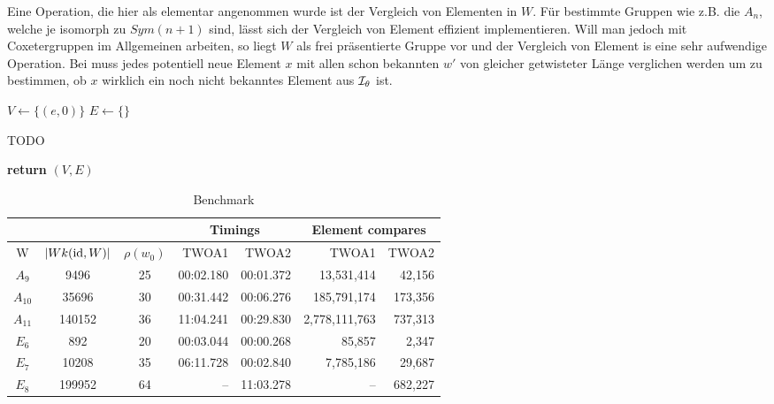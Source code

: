 Eine Operation, die hier als elementar angenommen wurde ist der Vergleich von
Elementen in $W$. Für bestimmte Gruppen wie z.B. die $A_n$, welche je isomorph
zu $Sym(n+1)$ sind, lässt sich der Vergleich von Element effizient
implementieren. Will man jedoch mit Coxetergruppen im Allgemeinen arbeiten, so
liegt $W$ als frei präsentierte Gruppe vor und der Vergleich von Element is eine
sehr aufwendige Operation. Bei  muss jedes
potentiell neue Element $x$ mit allen schon bekannten $w'$ von gleicher
getwisteter Länge verglichen werden um zu bestimmen, ob $x$ wirklich ein noch
nicht bekanntes Element aus $\mathcal{I}_{\theta}$ ist.

\begin{algo}[Algorithmus 2]
	\hfill
	\label{twoa2}
	\begin{algorithmic}[1]
	 
	\State $V \gets \{(e,0)\}$
	\State $E \gets \{\}$

		\State TODO
	\EndFor

	\State \textbf{return} $(V,E)$
	\EndProcedure
	\end{algorithmic}
\end{algo}

\begin{table}
	\label{benchmark-twoa}
	\centering
	\begin{tabular}{|c|c|c|r|r|r|r|}
	\hline
	\multicolumn{3}{|c|}{} & \multicolumn{2}{|c|}{Timings} &
	\multicolumn{2}{|c|}{Element compares}\\
	\hline
	W & $|Wk(\operatorname{id},W)|$ & $\rho(w_0)$ & TWOA1 & TWOA2 & TWOA1 & TWOA2\\
	\hline
	$A_9$ & 9496 & 25 & 00:02.180 & 00:01.372 & 13,531,414 & 42,156\\
	\hline
	$A_{10}$ & 35696 & 30 & 00:31.442 & 00:06.276 & 185,791,174 & 173,356\\
	\hline
	$A_{11}$ & 140152 & 36 & 11:04.241 & 00:29.830 & 2,778,111,763 & 737,313\\
	\hline
	$E_6$ & 892 & 20 & 00:03.044 & 00:00.268 & 85,857 & 2,347\\
	\hline
	$E_7$ & 10208 & 35 & 06:11.728 & 00:02.840 & 7,785,186 & 29,687\\
	\hline
	$E_8$ & 199952 & 64 & -- & 11:03.278 & -- & 682,227\\
	\hline
	\end{tabular}
	\caption{Benchmark}
\end{table}

